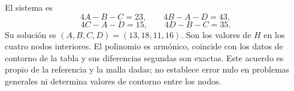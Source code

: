 El sistema es
\[
4A-B-C=23,\qquad 4B-A-D=43,
\]
\[
4C-A-D=15,\qquad 4D-B-C=35.
\]
Su solución es \((A,B,C,D)=(13,18,11,16)\). Son los valores de \(H\) en los cuatro nodos interiores. El polinomio es armónico, coincide con los datos de contorno de la tabla y sus diferencias segundas son exactas. Este acuerdo es propio de la referencia y la malla dadas; no establece error nulo en problemas generales ni determina valores de contorno entre los nodos.
